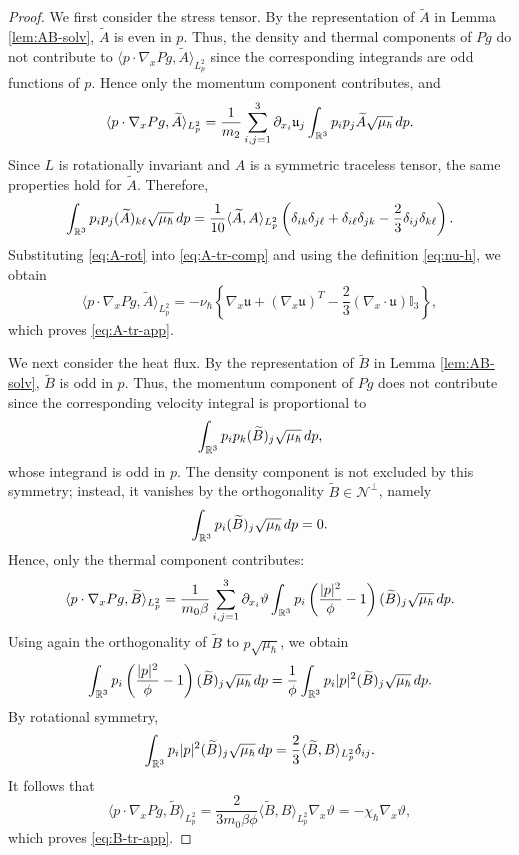 \documentclass[10pt,a4paper]{amsart}
\newcommand{\bq}{\begin{equation}}
\newcommand{\calN}{\mathcal N}
\newcommand{\eq}{\end{equation}}
\newcommand{\intr}{\int_{\mR^3}}
\newcommand{\lal}{\langle}
\newcommand{\lt}{\left}
\newcommand{\mR}{\mathbb{R}}
\newcommand{\mfu}{\mathfrak{u}}
\newcommand{\ral}{\rangle}
\newcommand{\rdp}{\textnormal{d}p}
\newcommand{\rt}{\right}
\newcommand{\vth}{\vartheta}
\begin{document}
\begin{proof}
We first consider the stress tensor. By the representation of $\widetilde A$ in Lemma \ref{lem:AB-solv}, $\widetilde A$ is even in $p$. Thus, the density and thermal components of $Pg$ do not contribute to $\lal p\cdot\nabla_xPg,\widetilde A\ral_{L^2_p}$ since the corresponding integrands are odd functions of $p$. Hence only the momentum component contributes, and
\bq\label{eq:A-tr-comp}
\lal p\cdot\nabla_xP g,\widetilde A \ral_{L^2_p}=\frac{1}{m_2 }\sum_{i,j=1}^3\partial_{x_i}\mfu_j\intr p_ip_j\widetilde A \sqrt{\mu_\hbar}\,\rdp.
\eq
Since $L $ is rotationally invariant and $A $ is a symmetric traceless tensor, the same properties hold for $\widetilde A $. Therefore,
\bq\label{eq:A-rot}
\intr p_ip_j(\widetilde A )_{k\ell}\sqrt{\mu_\hbar}\,\rdp=\frac{1}{10}\lal\widetilde A ,A \ral_{L^2_p}\lt(\delta_{ik}\delta_{j\ell}+\delta_{i\ell}\delta_{jk}-\frac{2}{3}\delta_{ij}\delta_{k\ell}\rt).
\eq
Substituting \eqref{eq:A-rot} into \eqref{eq:A-tr-comp} and using the definition \eqref{eq:nu-h}, we obtain
\[
\lal p\cdot\nabla_xP g,\widetilde A \ral_{L^2_p}=-\nu_\hbar\lt\{\nabla_x\mfu+(\nabla_x\mfu)^T-\frac{2}{3}(\nabla_x\cdot\mfu) \mathbb I_3\rt\},
\]
which proves \eqref{eq:A-tr-app}.

We next consider the heat flux. By the representation of $\widetilde B$ in Lemma \ref{lem:AB-solv}, $\widetilde B$ is odd in $p$. Thus, the momentum component of $Pg$ does not contribute since the corresponding velocity integral is proportional to
\[
\intr p_i p_k(\widetilde B)_j\sqrt{\mu_\hbar}\,\rdp,
\]
whose integrand is odd in $p$. The density component is not excluded by this symmetry; instead, it vanishes by the orthogonality $\widetilde B\in\calN^\perp$, namely
\[
\intr p_i(\widetilde B )_j\sqrt{\mu_\hbar}\,\rdp=0.
\]
Hence, only the thermal component contributes:
\[
\lal p\cdot\nabla_xP g,\widetilde B \ral_{L^2_p}=\frac{1}{m_0\beta}\sum_{i,j=1}^3\partial_{x_i}\vth\intr p_i\lt(\frac{|p|^2}{\phi }-1\rt)(\widetilde B )_j\sqrt{\mu_\hbar}\,\rdp.
\]
Using again the orthogonality of $\widetilde B $ to $p\sqrt{\mu_\hbar}$, we obtain
\[
\intr p_i\lt(\frac{|p|^2}{\phi }-1\rt)(\widetilde B )_j\sqrt{\mu_\hbar}\,\rdp=\frac{1}{\phi }\intr p_i|p|^2(\widetilde B )_j\sqrt{\mu_\hbar}\,\rdp.
\]
By rotational symmetry,
\[
\intr p_i|p|^2(\widetilde B )_j\sqrt{\mu_\hbar}\,\rdp=\frac{2}{3}\lal\widetilde B ,B \ral_{L^2_p}\delta_{ij}.
\]
It follows that
\[
\lal p\cdot\nabla_xP g,\widetilde B \ral_{L^2_p}=\frac{2}{3m_0\beta\phi }\lal\widetilde B ,B \ral_{L^2_p}\nabla_x\vth=-\chi_\hbar\nabla_x\vth,
\]
which proves \eqref{eq:B-tr-app}.
\end{proof}
\end{document}
